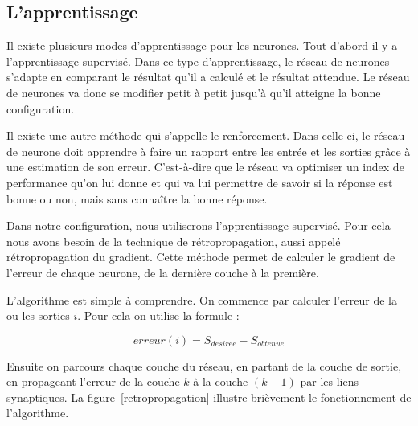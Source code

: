 \documentclass[11pt]{report}
\begin{document}
\subsection{L'apprentissage}

Il existe plusieurs modes d'apprentissage pour les neurones. Tout d'abord il y a l'apprentissage supervisé. Dans ce type d'apprentissage, le réseau de neurones s'adapte en comparant le résultat qu'il a calculé et le résultat attendue. Le réseau de neurones va donc se modifier petit à petit jusqu'à qu'il atteigne la bonne configuration.

Il existe une autre méthode qui s'appelle le renforcement. Dans celle-ci, le réseau de neurone doit apprendre à faire un rapport entre les entrée et les sorties grâce à une estimation de son erreur. C'est-à-dire que le réseau va optimiser un index de performance qu'on lui donne et qui va lui permettre de savoir si la réponse est bonne ou non, mais sans connaître la  bonne réponse.

Dans notre configuration, nous utiliserons l'apprentissage supervisé. Pour cela nous avons besoin de la technique de rétropropagation, aussi appelé rétropropagation du gradient. Cette méthode permet de calculer le gradient de l'erreur de chaque neurone, de la dernière couche à la première.

L'algorithme est simple à comprendre. On commence par calculer l'erreur de la ou les sorties $i$. Pour cela on utilise la formule :

\[ erreur(i) = S_{desiree} - S_{obtenue} \]

Ensuite on parcours chaque couche du réseau, en partant de la couche de sortie, en propageant l'erreur de la couche $k$ à la couche $(k-1)$ par les liens synaptiques. La figure~\ref{retropropagation} illustre brièvement le fonctionnement de l'algorithme.
\end{document}
